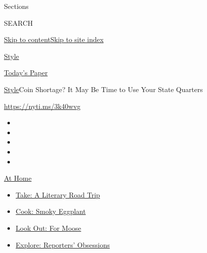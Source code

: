 Sections

SEARCH

\protect\hyperlink{site-content}{Skip to
content}\protect\hyperlink{site-index}{Skip to site index}

\href{https://www.nytimes3xbfgragh.onion/section/style}{Style}

\href{https://myaccount.nytimes3xbfgragh.onion/auth/login?response_type=cookie\&client_id=vi}{}

\href{https://www.nytimes3xbfgragh.onion/section/todayspaper}{Today's
Paper}

\href{/section/style}{Style}\textbar{}Coin Shortage? It May Be Time to
Use Your State Quarters

\url{https://nyti.ms/3k40wvg}

\begin{itemize}
\item
\item
\item
\item
\item
\end{itemize}

\href{https://www.nytimes3xbfgragh.onion/spotlight/at-home?action=click\&pgtype=Article\&state=default\&region=TOP_BANNER\&context=at_home_menu}{At
Home}

\begin{itemize}
\tightlist
\item
  \href{https://www.nytimes3xbfgragh.onion/2020/07/28/books/time-for-a-literary-road-trip.html?action=click\&pgtype=Article\&state=default\&region=TOP_BANNER\&context=at_home_menu}{Take:
  A Literary Road Trip}
\item
  \href{https://www.nytimes3xbfgragh.onion/2020/07/29/magazine/bored-with-your-home-cooking-some-smoky-eggplant-will-fix-that.html?action=click\&pgtype=Article\&state=default\&region=TOP_BANNER\&context=at_home_menu}{Cook:
  Smoky Eggplant}
\item
  \href{https://www.nytimes3xbfgragh.onion/2020/07/27/travel/moose-michigan-isle-royale.html?action=click\&pgtype=Article\&state=default\&region=TOP_BANNER\&context=at_home_menu}{Look
  Out: For Moose}
\item
  \href{https://www.nytimes3xbfgragh.onion/interactive/2020/at-home/even-more-reporters-editors-diaries-lists-recommendations.html?action=click\&pgtype=Article\&state=default\&region=TOP_BANNER\&context=at_home_menu}{Explore:
  Reporters' Obsessions}
\end{itemize}

